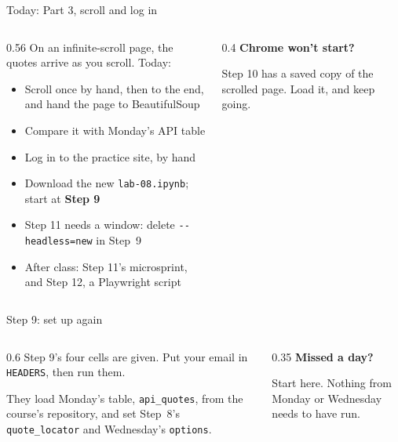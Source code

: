 \documentclass[9pt,aspectratio=169]{beamer}
\begin{document}
\begin{frame}{Today: Part 3, scroll and log in}
    \begin{columns}[T]
        \begin{column}{0.56\textwidth}
            On an infinite-scroll page, the quotes arrive as you scroll. Today:
            \begin{itemize}\small
                \item Scroll once by hand, then to the end, and hand the page to BeautifulSoup
                \item Compare it with Monday's API table
                \item Log in to the practice site, by hand
            \end{itemize}

            \medskip
            \begin{itemize}\small
                \item Download the new \texttt{lab-08.ipynb}; start at \textbf{Step 9}
                \item Step 11 needs a window: delete \texttt{-{}-headless=new} in Step~9
                \item After class: Step 11's microsprint, and Step 12, a Playwright script
            \end{itemize}
        \end{column}
        \begin{column}{0.4\textwidth}
            \textbf{Chrome won't start?}\\[2pt]
            {\footnotesize Step 10 has a saved copy of the scrolled page. Load it, and keep going.\par}
        \end{column}
    \end{columns}
\end{frame}

\begin{frame}{Step 9: set up again}
    \begin{columns}[T]
        \begin{column}{0.6\textwidth}
            Step 9's four cells are given. Put your email in \texttt{HEADERS}, then run them.

            \medskip
            They load Monday's table, \texttt{api\_quotes}, from the course's repository, and set Step~8's \texttt{quote\_locator} and Wednesday's \texttt{options}.
        \end{column}
        \begin{column}{0.35\textwidth}
            \textbf{Missed a day?}\\[2pt]
            {\footnotesize Start here. Nothing from Monday or Wednesday needs to have run.\par}
        \end{column}
    \end{columns}
\end{frame}
\end{document}

